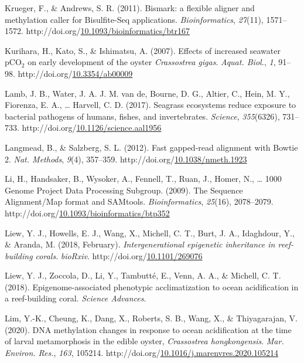 \documentclass [11pt, proquest] {uwthesis}[2015/03/03]
\newlength{\cslhangindent}
\newenvironment{CSLReferences}%
{\setlength{\parindent}{0pt}%
\everypar{\setlength{\hangindent}{\cslhangindent}}\ignorespaces}%
{\par}
\begin{document}
\begin{CSLReferences}{1}{0}
\leavevmode\hypertarget{ref-Krueger2011}{}%
Krueger, F., \& Andrews, S. R. (2011). {Bismark: a flexible aligner and methylation caller for Bisulfite-Seq applications}. \emph{Bioinformatics}, \emph{27}(11), 1571--1572. http://doi.org/\href{https://doi.org/10.1093/bioinformatics/btr167}{10.1093/bioinformatics/btr167}

\leavevmode\hypertarget{ref-Kurihara2007}{}%
Kurihara, H., Kato, S., \& Ishimatsu, A. (2007). {Effects of increased seawater {pCO\(_2\)} on early development of the oyster \emph{Crassostrea gigas}}. \emph{Aquat. Biol.}, \emph{1}, 91--98. http://doi.org/\href{https://doi.org/10.3354/ab00009}{10.3354/ab00009}

\leavevmode\hypertarget{ref-Lamb2017}{}%
Lamb, J. B., Water, J. A. J. M. van de, Bourne, D. G., Altier, C., Hein, M. Y., Fiorenza, E. A., \ldots{} Harvell, C. D. (2017). {Seagrass ecosystems reduce exposure to bacterial pathogens of humans, fishes, and invertebrates}. \emph{Science}, \emph{355}(6326), 731--733. http://doi.org/\href{https://doi.org/10.1126/science.aal1956}{10.1126/science.aal1956}

\leavevmode\hypertarget{ref-Langmead2012}{}%
Langmead, B., \& Salzberg, S. L. (2012). {Fast gapped-read alignment with Bowtie 2}. \emph{Nat. Methods}, \emph{9}(4), 357--359. http://doi.org/\href{https://doi.org/10.1038/nmeth.1923}{10.1038/nmeth.1923}

\leavevmode\hypertarget{ref-Li2009}{}%
Li, H., Handsaker, B., Wysoker, A., Fennell, T., Ruan, J., Homer, N., \ldots{} 1000 Genome Project Data Processing Subgroup. (2009). {The Sequence Alignment/Map format and SAMtools}. \emph{Bioinformatics}, \emph{25}(16), 2078--2079. http://doi.org/\href{https://doi.org/10.1093/bioinformatics/btp352}{10.1093/bioinformatics/btp352}

\leavevmode\hypertarget{ref-Liew2018a}{}%
Liew, Y. J., Howells, E. J., Wang, X., Michell, C. T., Burt, J. A., Idaghdour, Y., \& Aranda, M. (2018, February). \emph{{Intergenerational epigenetic inheritance in reef-building corals}}. \emph{bioRxiv}. http://doi.org/\href{https://doi.org/10.1101/269076}{10.1101/269076}

\leavevmode\hypertarget{ref-Liew2018b}{}%
Liew, Y. J., Zoccola, D., Li, Y., Tambutté, E., Venn, A. A., \& Michell, C. T. (2018). {Epigenome-associated phenotypic acclimatization to ocean acidification in a reef-building coral}. \emph{Science Advances}.

\leavevmode\hypertarget{ref-Lim2020}{}%
Lim, Y.-K., Cheung, K., Dang, X., Roberts, S. B., Wang, X., \& Thiyagarajan, V. (2020). {DNA methylation changes in response to ocean acidification at the time of larval metamorphosis in the edible oyster, \emph{Crassostrea hongkongensis}}. \emph{Mar. Environ. Res.}, \emph{163}, 105214. http://doi.org/\href{https://doi.org/10.1016/j.marenvres.2020.105214}{10.1016/j.marenvres.2020.105214}


\end{CSLReferences}
\end{document}
